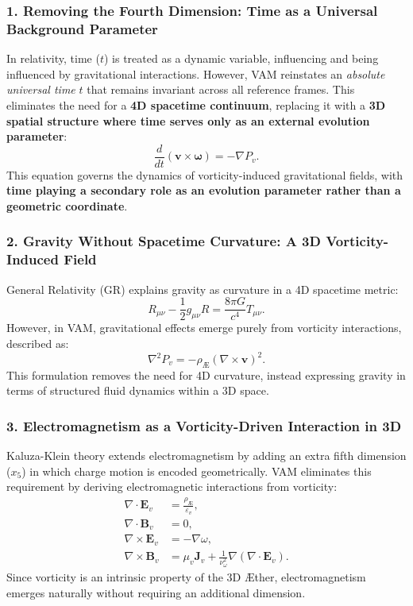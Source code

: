 \documentclass[a4paper,10pt]{article}
\begin{document}
\subsubsection{1. Removing the Fourth Dimension: Time as a Universal Background Parameter}
In relativity, time (\( t \)) is treated as a dynamic variable, influencing and being influenced by gravitational interactions. However, VAM reinstates an \textit{absolute universal time} \( t \) that remains invariant across all reference frames. This eliminates the need for a \textbf{4D spacetime continuum}, replacing it with a \textbf{3D spatial structure where time serves only as an external evolution parameter}:
\begin{equation*}
    \frac{d}{dt} (\mathbf{v} \times \boldsymbol{\omega}) = -\nabla P_v.
\end{equation*}
This equation governs the dynamics of vorticity-induced gravitational fields, with \textbf{time playing a secondary role as an evolution parameter rather than a geometric coordinate}.

\subsubsection{2. Gravity Without Spacetime Curvature: A 3D Vorticity-Induced Field}
General Relativity (GR) explains gravity as curvature in a 4D spacetime metric:
\begin{equation*}
    R_{\mu\nu} - \frac{1}{2} g_{\mu\nu} R = \frac{8\pi G}{c^4} T_{\mu\nu}.
\end{equation*}
However, in VAM, gravitational effects emerge purely from vorticity interactions, described as:
\begin{equation*}
    \nabla^2 P_v = -\rho_\text{\AE} (\nabla \times \mathbf{v})^2.
\end{equation*}
This formulation removes the need for 4D curvature, instead expressing gravity in terms of structured fluid dynamics within a 3D space.

\subsubsection{3. Electromagnetism as a Vorticity-Driven Interaction in 3D}
Kaluza-Klein theory extends electromagnetism by adding an extra fifth dimension (\( x_5 \)) in which charge motion is encoded geometrically. VAM eliminates this requirement by deriving electromagnetic interactions from vorticity:
\begin{align}
    \nabla \cdot \mathbf{E}_v &= \frac{\rho_\text{\AE}}{\varepsilon_v}, \\
    \nabla \cdot \mathbf{B}_v &= 0, \\
    \nabla \times \mathbf{E}_v &= -\nabla \omega, \\
    \nabla \times \mathbf{B}_v &= \mu_v \mathbf{J}_v + \frac{1}{\nu_{\omega}^2} \nabla (\nabla \cdot \mathbf{E}_v).
\end{align}
Since vorticity is an intrinsic property of the 3D Æther, electromagnetism emerges naturally without requiring an additional dimension.
\end{document}
